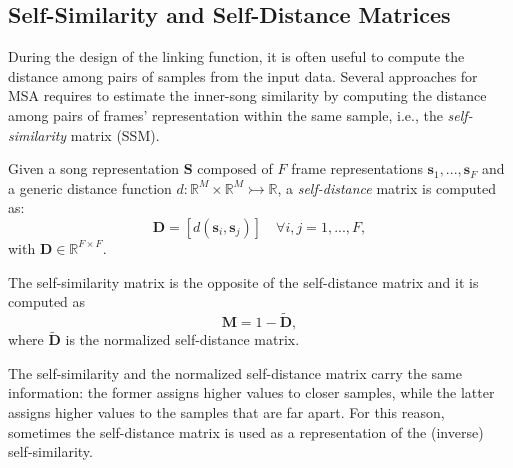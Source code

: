 \subsection{Self-Similarity and Self-Distance Matrices}\label{sec:ML:self}
During the design of the linking function, it is often useful to compute the distance among pairs of samples from the input data. %
Several approaches for MSA requires to estimate the inner-song similarity by computing the distance among pairs of frames' representation within the same sample, i.e., the \textit{self-similarity} matrix (SSM).

Given a song representation $\mathbf{S}$ composed of $F$ frame representations $\mathbf{s}_1,..., \mathbf{s}_F$ and a generic distance function $d: \mathbb{R}^{M} \times \mathbb{R}^{M} \rightarrowtail \mathbb{R}$, a \textit{self-distance} matrix is computed as:
\begin{equation}
\mathbf{D}=[d(\mathbf{s}_{i}, \mathbf{s}_{j})] \quad \forall i,j= 1,...,F,
\end{equation}
with $\mathbf{D} \in \mathbb{R}^{F \times F}$. 

The self-similarity matrix is the opposite of the self-distance matrix and it is computed as 
\begin{equation}
\mathbf{M}=1-\tilde{\mathbf{D}},
\end{equation}
where $\tilde{\mathbf{D}}$ is the normalized self-distance matrix. 

The self-similarity and the normalized self-distance matrix carry the same information: the former assigns higher values to closer samples, while the latter assigns higher values to the samples that are far apart. For this reason, sometimes the self-distance matrix is used as a representation of the (inverse) self-similarity.

